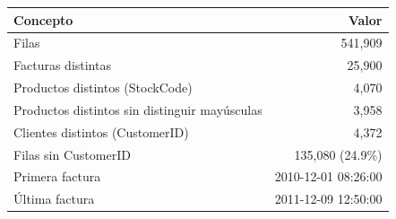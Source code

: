 \begin{tabular}{lr}
\toprule
Concepto & Valor \\
\midrule
Filas & 541,909 \\
Facturas distintas & 25,900 \\
Productos distintos (StockCode) & 4,070 \\
Productos distintos sin distinguir mayúsculas & 3,958 \\
Clientes distintos (CustomerID) & 4,372 \\
Filas sin CustomerID & 135,080 (24.9\%) \\
Primera factura & 2010-12-01 08:26:00 \\
Última factura & 2011-12-09 12:50:00 \\
\bottomrule
\end{tabular}
